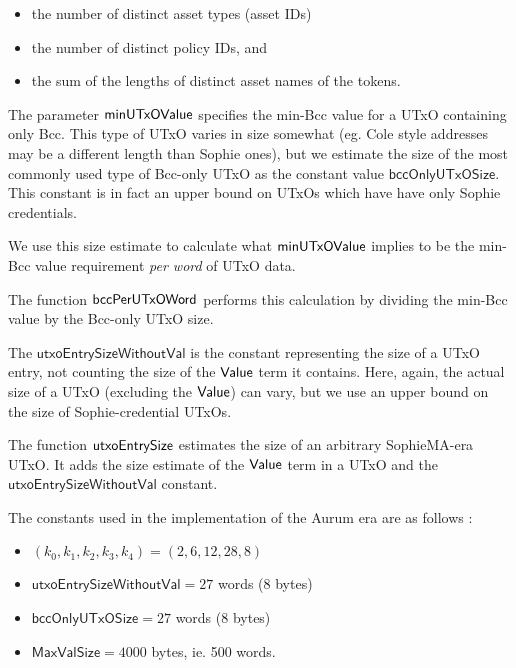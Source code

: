 \begin{itemize}
  \item the number of distinct asset types (asset IDs)
  \item the number of distinct policy IDs, and
  \item the sum of the lengths of distinct asset names of the tokens.
\end{itemize}

The parameter $\mathsf{minUTxOValue}$ specifies the min-Bcc value for a UTxO containing
only Bcc. This type of UTxO varies in size somewhat (eg. Cole style addresses
may be a different length than Sophie ones), but we estimate the size of the most commonly
used type of Bcc-only UTxO as the constant value $\mathsf{bccOnlyUTxOSize}$.
This constant is in fact an upper bound on UTxOs which have have only Sophie credentials.

We use this size estimate
to calculate what $\mathsf{minUTxOValue}$ implies to be the min-Bcc value requirement
\emph{per word} of UTxO data.

The function $\mathsf{bccPerUTxOWord}$ performs this calculation by dividing the
min-Bcc value by the Bcc-only UTxO size.

The $\mathsf{utxoEntrySizeWithoutVal}$ is the constant representing
the size of a UTxO entry, not counting the size of the $\mathsf{Value}$ term it contains.
Here, again, the actual size of a UTxO (excluding the $\mathsf{Value}$) can vary, but
we use an upper bound on the size of Sophie-credential UTxOs.

The function $\mathsf{utxoEntrySize}$ estimates the size of an arbitrary SophieMA-era
UTxO. It adds the size estimate of the $\mathsf{Value}$ term in a UTxO and the
$\mathsf{utxoEntrySizeWithoutVal}$ constant.

The constants used in the implementation of the Aurum era are as follows :

\begin{itemize}
  \item $(k_0, k_1, k_2, k_3, k_4) = (2, 6, 12, 28, 8)$
  \item $\mathsf{utxoEntrySizeWithoutVal} = 27$ words (8 bytes)
  \item $\mathsf{bccOnlyUTxOSize} = 27$ words (8 bytes)
  \item $\mathsf{MaxValSize} = 4000$ bytes, ie. 500 words.
\end{itemize}
